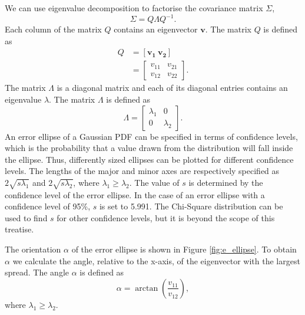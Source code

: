 \documentclass[12pt,oneside,openany,a4paper, %
afrikaans,english,
]{memoir}
\numberwithin{equation}{chapter}
\begin{document}
{We can use eigenvalue decomposition to factorise the covariance matrix $\Sigma$,
\begin{equation}
\Sigma = Q\Lambda Q^{-1}.
\end{equation}
Each column of the matrix $Q$ contains an eigenvector $\bm{v}$. The matrix $Q$ is defined as
\begin{equation}
\begin{split}
Q & =
[\bm{v_1} \ \bm{v_2}]\\
& =
\begin{bmatrix}
v_{11} & v_{21}\\
v_{12} & v_{22}
\end{bmatrix}.
\end{split}
\end{equation}
The matrix $\Lambda$ is a diagonal matrix and each of its diagonal entries contains an eigenvalue $\lambda$. The matrix $\Lambda$ is defined as 
\begin{equation}
\Lambda =
\begin{bmatrix}
\lambda_1 & 0\\
0 & \lambda_2
\end{bmatrix}.
\end{equation}
An error ellipse of a Gaussian PDF can be specified in terms of confidence levels, which is the probability that a value drawn from the distribution will fall inside the ellipse. Thus, differently sized ellipses can be plotted for different confidence levels. The lengths of the major and minor axes are respectively specified as $2\sqrt{s\lambda_1}$ and $2\sqrt{s\lambda_2}$, where $\lambda_1 \geq \lambda_2$. The value of $s$ is determined by the confidence level of the error ellipse. In the case of an error ellipse with a confidence level of 95\%, $s$ is set to 5.991. The Chi-Square distribution can be used to find $s$ for other confidence levels, but it is beyond the scope of this treatise.

The orientation $\alpha$ of the error ellipse is shown in Figure \ref{fig:e_ellipse}. To obtain $\alpha$ we calculate the angle, relative to the x-axis, of the eigenvector with the largest spread. The angle $\alpha$ is defined as
\begin{equation}
\alpha = \arctan\left(\frac{v_{11}}{v_{12}}\right),
\end{equation}
where $\lambda_1 \geq \lambda_2$.

}
\end{document}
